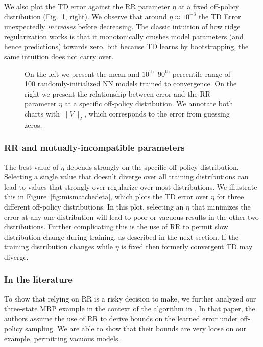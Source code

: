 \documentclass[11pt]{article}
\begin{document}
We also plot the TD error against the RR parameter $\eta$ at a fixed off-policy distribution (Fig.~\ref{fig:multilayerperformance}, right). We observe that around $\eta\approx 10^{-3}$ the TD Error unexpectedly \emph{increases} before decreasing. The classic intuition of how ridge regularization works is that it monotonically crushes model parameters (and hence predictions) towards zero, but because TD learns by bootstrapping, the same intuition does not carry over.

\begin{figure}
  
  \caption{On the left we present the mean and $10^\text{th}$--$90^\text{th}$ percentile range of 100 randomly-initialized NN models trained to convergence. On the right we present the relationship between error and the RR parameter $\eta$ at a specific off-policy distribution. We annotate both charts with $\|V\|_2$, which corresponds to the error from guessing zeros. }
  \label{fig:multilayerperformance}
\end{figure}

\subsubsection{RR and mutually-incompatible parameters}

The best value of $\eta$ depends strongly on the specific off-policy distribution. Selecting a single value that doesn't diverge over all training distributions can lead to values that strongly over-regularize over most distributions. We illustrate this in Figure~\ref{fig:mismatchedeta}, which plots the TD error over $\eta$ for three different off-policy distributions. In this plot, selecting an $\eta$ that minimizes the error at any one distribution will lead to poor or vacuous results in the other two distributions.
Further complicating this is the use of RR to permit slow distribution change during training, as described in the next section. If the training distribution changes while $\eta$ is fixed then formerly convergent TD may diverge.

\subsubsection{In the literature}

To show that relying on RR is a risky decision to make, we further analyzed our three-state MRP example in the context of the algorithm in  \citep{zhang2021breaking}. In that paper, the authors assume the use of RR to derive bounds on the learned error under off-policy sampling. We are able to show that their bounds are very loose on our example, permitting vacuous models.
\end{document}
